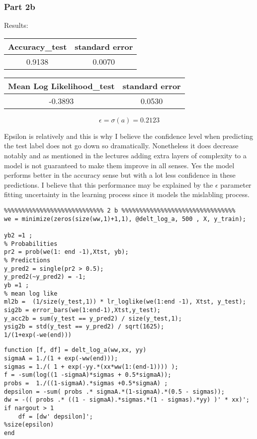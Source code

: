 \documentclass[11pt]{article}
\begin{document}
\subsubsection{Part 2b}


Results:
\begin{center}
\begin{tabular}{|c|c|}
\hline
Accuracy\_test & standard error \\
 \hline
0.9138 & 0.0070  \\
\hline
\end{tabular}
\begin{tabular}{|c|c|}
\hline
Mean Log Likelihood\_test & standard error \\
 \hline
-0.3893 & 0.0530 \\
\hline
\end{tabular}
\end{center}

\[
\epsilon = \sigma(a) = 0.2123
\]

Epsilon is relatively and this is why I believe the confidence level when predicting the  test label does not go down so dramatically. Nonetheless it does decrease notably and as mentioned in the lectures adding extra layers of complexity to a model is not guaranteed to make them improve in all senses. Yes the model performs better in the accuracy sense but with a lot less confidence in these predictions. I believe that this performance may be explained by the $\epsilon$ parameter fitting uncertainty in the learning process since it models the mislabling process.

\begin{lstlisting}
%%%%%%%%%%%%%%%%%%%%%%%%%%%% 2 b %%%%%%%%%%%%%%%%%%%%%%%%%%%%%%%%
we = minimize(zeros(size(ww,1)+1,1), @delt_log_a, 500 , X, y_train); 

yb2 =1 ;
% Probabilities
pr2 = prob(we(1: end -1),Xtst, yb);
% Predictions
y_pred2 = single(pr2 > 0.5);
y_pred2(~y_pred2) = -1;
yb =1 ;
% mean log like
ml2b =  (1/size(y_test,1)) * lr_loglike(we(1:end -1), Xtst, y_test);
sig2b = error_bars(we(1:end-1),Xtst,y_test);
y_acc2b = sum(y_test == y_pred2) / size(y_test,1);
ysig2b = std(y_test == y_pred2) / sqrt(1625);
1/(1+exp(-we(end)))
\end{lstlisting}

\begin{lstlisting}
function [f, df] = delt_log_a(ww,xx, yy)
sigmaA = 1./(1 + exp(-ww(end)));
sigmas = 1./( 1 + exp(-yy.*(xx*ww(1:(end-1)))) );
f = -sum(log((1 -sigmaA)*sigmas + 0.5*sigmaA));
probs =  1./((1-sigmaA).*sigmas +0.5*sigmaA) ;
depsilon = -sum( probs .* sigmaA.*(1-sigmaA).*(0.5 - sigmas));
dw = -(( probs .* ((1 - sigmaA).*sigmas.*(1 - sigmas).*yy) )' * xx)';
if nargout > 1
    df = [dw' depsilon]';
%size(epsilon)
end
\end{lstlisting}
\end{document}
